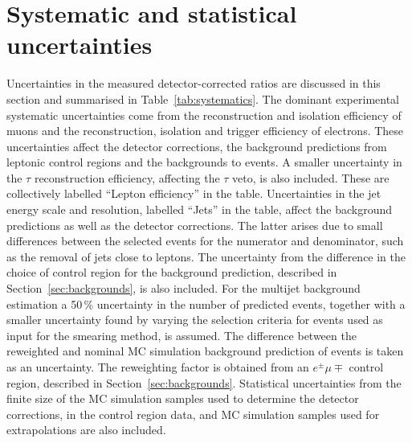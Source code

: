 \documentclass[cernpreprint,txfonts,UKenglish,texlive=2016]{\ATLASLATEXPATH atlasdoc}
\begin{document}
\section{Systematic and statistical uncertainties}
\label{sec:syst}
Uncertainties in the measured detector-corrected ratios are discussed in this section and
summarised in Table~\ref{tab:systematics}.
The dominant experimental systematic uncertainties come from the
reconstruction and isolation efficiency of muons and the  reconstruction,
isolation and trigger efficiency of electrons. These uncertainties affect the detector corrections, the
\W{} background predictions from leptonic control
regions and the backgrounds to \lljet{} events.
A smaller uncertainty in the $\tau$ reconstruction efficiency, affecting the 
$\tau$ veto, is also included.
These are collectively labelled ``Lepton efficiency'' in the table.
Uncertainties in the jet energy scale and resolution, labelled ``Jets''
in the table, affect the
background predictions as well as the detector
corrections. The latter arises due to small differences between the selected
events for the numerator and denominator, such as the removal of jets close to leptons.
The uncertainty from the difference in the choice of control region for the \Wtaunu{}
background prediction, described in Section~\ref{sec:backgrounds}, is also included.
For the multijet background
estimation a 50\,\% uncertainty in the number of predicted 
events, together with a smaller uncertainty found by varying the
selection criteria for events used as input for the smearing
method, is assumed.
The difference between the reweighted and nominal MC simulation background
prediction of \lljet{} events is taken as an uncertainty. The
reweighting factor is obtained from an $e^{\pm}\mu{\mp}$ control
region, described in Section~\ref{sec:backgrounds}.
Statistical uncertainties from the finite size of the MC simulation samples used to determine
the detector corrections, in the \W{} control region data, and MC 
simulation samples used for extrapolations are also included.
\end{document}
